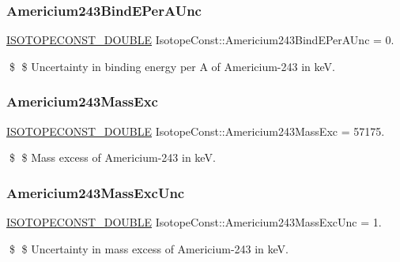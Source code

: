 \subsubsection{\texorpdfstring{Americium243\+Bind\+E\+Per\+A\+Unc}{Americium243BindEPerAUnc}}
{\footnotesize\ttfamily \mbox{\hyperlink{group___isotope_const-_macros_ga8f45a7272ce02c0b4c65c44636ed719a}{I\+S\+O\+T\+O\+P\+E\+C\+O\+N\+S\+T\+\_\+\+D\+O\+U\+B\+LE}} Isotope\+Const\+::\+Americium243\+Bind\+E\+Per\+A\+Unc = 0.}

\$ \$ Uncertainty in binding energy per A of Americium-\/243 in keV. \mbox{\label{group___isotope_const-_americium-_am243_gac7a303d6a248b4823ac10b924741b0fb}} 
\subsubsection{\texorpdfstring{Americium243\+Mass\+Exc}{Americium243MassExc}}
{\footnotesize\ttfamily \mbox{\hyperlink{group___isotope_const-_macros_ga8f45a7272ce02c0b4c65c44636ed719a}{I\+S\+O\+T\+O\+P\+E\+C\+O\+N\+S\+T\+\_\+\+D\+O\+U\+B\+LE}} Isotope\+Const\+::\+Americium243\+Mass\+Exc = 57175.}

\$ \$ Mass excess of Americium-\/243 in keV. \mbox{\label{group___isotope_const-_americium-_am243_ga57876bf57996731fa56a6f384cca3b9a}} 
\subsubsection{\texorpdfstring{Americium243\+Mass\+Exc\+Unc}{Americium243MassExcUnc}}
{\footnotesize\ttfamily \mbox{\hyperlink{group___isotope_const-_macros_ga8f45a7272ce02c0b4c65c44636ed719a}{I\+S\+O\+T\+O\+P\+E\+C\+O\+N\+S\+T\+\_\+\+D\+O\+U\+B\+LE}} Isotope\+Const\+::\+Americium243\+Mass\+Exc\+Unc = 1.}

\$ \$ Uncertainty in mass excess of Americium-\/243 in keV. \mbox{\label{group___isotope_const-_americium-_am243_gadc0332bb4cd000a22e76c4e7cd062cd0}} 
